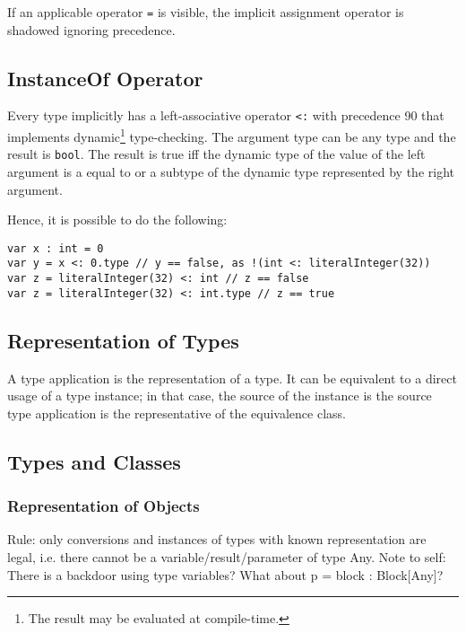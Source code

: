 If an applicable operator \texttt{=} is visible, the implicit assignment operator is shadowed ignoring precedence.


\subsection{InstanceOf Operator}

Every type implicitly has a left-associative operator \texttt{<:} with precedence 90 that implements dynamic\footnote{The result may be evaluated at compile-time.} type-checking.
The argument type can be any type and the result is \texttt{bool}.
The result is true iff the dynamic type of the value of the left argument is a equal to or a subtype of the dynamic type represented by the right argument.


Hence, it is possible to do the following:
\begin{lstlisting}[language=tyr]
var x : int = 0
var y = x <: 0.type // y == false, as !(int <: literalInteger(32))
var z = literalInteger(32) <: int // z == false
var z = literalInteger(32) <: int.type // z == true
\end{lstlisting}


\subsection{Representation of Types}

A type application is the representation of a type.
It can be equivalent to a direct usage of a type instance; in that case, the source of the instance is the source type application is the representative of the equivalence class.


\subsection{Types and Classes}

\subsubsection{Representation of Objects}

Rule: only conversions and instances of types with known representation are legal, i.e. there cannot be a variable/result/parameter of type Any.
Note to self: There is a backdoor using type variables?
What about p = block : Block[Any]?

